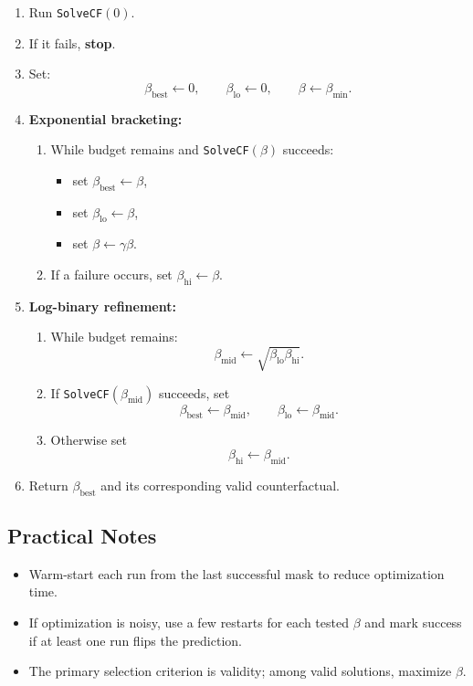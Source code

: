 \documentclass[11pt]{article}
\begin{document}
\begin{enumerate}
    \item Run \texttt{SolveCF}$(0)$.
    \item If it fails, \textbf{stop}.
    \item Set:
    \[
    \beta_{\mathrm{best}} \leftarrow 0,
    \qquad
    \beta_{\mathrm{lo}} \leftarrow 0,
    \qquad
    \beta \leftarrow \beta_{\min}.
    \]
    \item \textbf{Exponential bracketing:}
    \begin{enumerate}[label=\alph*)]
        \item While budget remains and \texttt{SolveCF}$(\beta)$ succeeds:
        \begin{itemize}
            \item set $\beta_{\mathrm{best}} \leftarrow \beta$,
            \item set $\beta_{\mathrm{lo}} \leftarrow \beta$,
            \item set $\beta \leftarrow \gamma \beta$.
        \end{itemize}
        \item If a failure occurs, set $\beta_{\mathrm{hi}} \leftarrow \beta$.
    \end{enumerate}
    \item \textbf{Log-binary refinement:}
    \begin{enumerate}[label=\alph*)]
        \item While budget remains:
        \[
        \beta_{\mathrm{mid}} \leftarrow \sqrt{\beta_{\mathrm{lo}}\beta_{\mathrm{hi}}}.
        \]
        \item If \texttt{SolveCF}$(\beta_{\mathrm{mid}})$ succeeds, set
        \[
        \beta_{\mathrm{best}} \leftarrow \beta_{\mathrm{mid}},
        \qquad
        \beta_{\mathrm{lo}} \leftarrow \beta_{\mathrm{mid}}.
        \]
        \item Otherwise set
        \[
        \beta_{\mathrm{hi}} \leftarrow \beta_{\mathrm{mid}}.
        \]
    \end{enumerate}
    \item Return $\beta_{\mathrm{best}}$ and its corresponding valid counterfactual.
\end{enumerate}

\subsection*{Practical Notes}
\begin{itemize}
    \item Warm-start each run from the last successful mask to reduce optimization time.
    \item If optimization is noisy, use a few restarts for each tested $\beta$ and mark success if at least one run flips the prediction.
    \item The primary selection criterion is validity; among valid solutions, maximize $\beta$.
\end{itemize}
\end{document}
